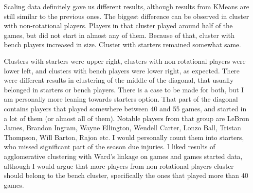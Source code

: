 \documentclass[a4paper]{article}
\begin{document}
Scaling data definitely gave us different results, although results from KMeans are still similar to the previous ones. The biggest difference can be observed in cluster with non-rotational players. Players in that cluster played around half of the games, but did not start in almost any of them. Because of that, cluster with bench players increased in size. Cluster with starters remained somewhat same.

Clusters with starters were upper right, clusters with non-rotational players were lower left, and clusters with bench players were lower right, as expected. There were different results in clustering of the middle of the diagonal, that usually belonged in starters or bench players. There is a case to be made for both, but I am personally more leaning towards starters option. That part of the diagonal contains players that played somewhere between 40 and 55 games, and started in a lot of them (or almost all of them). Notable players from that group are LeBron James, Brandon Ingram, Wayne Ellington, Wendell Carter, Lonzo Ball, Tristan Thompson, Will Barton, Rajon  etc. I would personally count them into starters, who missed significant part of the season due injuries. I liked results of agglomerative clustering with Ward's linkage on games and games started data, although I would argue that more players from non-rotational players cluster should belong to the bench cluster, specifically the ones that played more than 40 games.

\pagebreak

\appendix


\appendix
\end{document}
